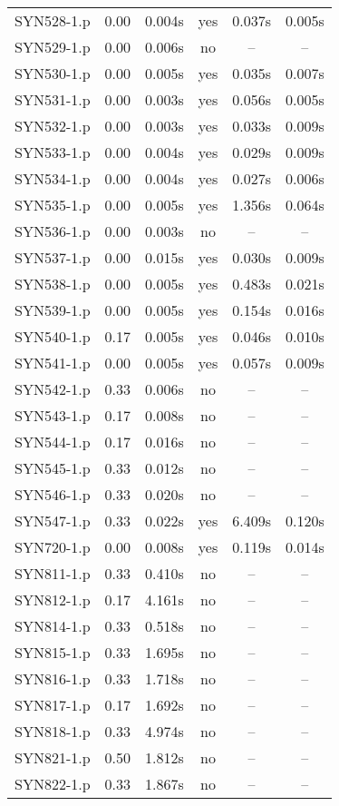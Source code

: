 \begin{center}
\begin{longtable}{||c | c | c | c | c | c||}
SYN528-1.p & 0.00 & 0.004s & yes & 0.037s & 0.005s \\
SYN529-1.p & 0.00 & 0.006s & no & -- & -- \\ 
SYN530-1.p & 0.00 & 0.005s & yes & 0.035s & 0.007s \\
SYN531-1.p & 0.00 & 0.003s & yes & 0.056s & 0.005s \\
SYN532-1.p & 0.00 & 0.003s & yes & 0.033s & 0.009s \\
SYN533-1.p & 0.00 & 0.004s & yes & 0.029s & 0.009s \\
SYN534-1.p & 0.00 & 0.004s & yes & 0.027s & 0.006s \\
SYN535-1.p & 0.00 & 0.005s & yes & 1.356s & 0.064s \\
SYN536-1.p & 0.00 & 0.003s & no & -- & -- \\
SYN537-1.p & 0.00 & 0.015s & yes & 0.030s & 0.009s \\
SYN538-1.p & 0.00 & 0.005s & yes & 0.483s & 0.021s \\
SYN539-1.p & 0.00 & 0.005s & yes & 0.154s & 0.016s \\
SYN540-1.p & 0.17 & 0.005s & yes & 0.046s & 0.010s \\
SYN541-1.p & 0.00 & 0.005s & yes & 0.057s & 0.009s \\
SYN542-1.p & 0.33 & 0.006s & no & -- & -- \\
SYN543-1.p & 0.17 & 0.008s & no & -- & -- \\
SYN544-1.p & 0.17 & 0.016s & no & -- & -- \\
SYN545-1.p & 0.33 & 0.012s & no & -- & -- \\
SYN546-1.p & 0.33 & 0.020s & no & -- & -- \\
SYN547-1.p & 0.33 & 0.022s & yes & 6.409s & 0.120s \\
SYN720-1.p & 0.00 & 0.008s & yes & 0.119s & 0.014s \\
SYN811-1.p & 0.33 & 0.410s & no & -- & -- \\
SYN812-1.p & 0.17 & 4.161s & no & -- & -- \\
SYN814-1.p & 0.33 & 0.518s & no & -- & -- \\
SYN815-1.p & 0.33 & 1.695s & no & -- & -- \\
SYN816-1.p & 0.33 & 1.718s & no & -- & -- \\
SYN817-1.p & 0.17 & 1.692s & no & -- & -- \\
SYN818-1.p & 0.33 & 4.974s & no & -- & -- \\	
SYN821-1.p & 0.50 & 1.812s & no & -- & -- \\
SYN822-1.p & 0.33 & 1.867s & no & -- & -- \\

\end{longtable}
\end{center}
